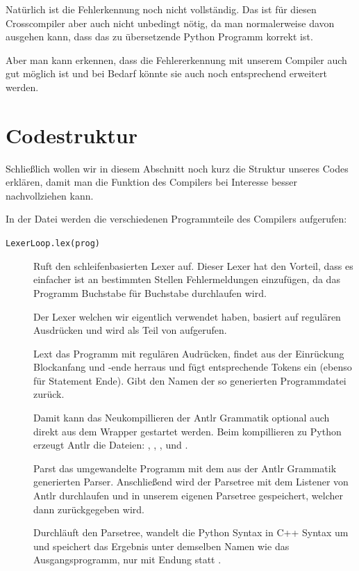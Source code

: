 Natürlich ist die Fehlerkennung noch nicht vollständig. Das ist für diesen Crosscompiler aber auch nicht unbedingt nötig, da man normalerweise davon ausgehen kann, dass das zu übersetzende Python Programm korrekt ist.

Aber man kann erkennen, dass die Fehlererkennung mit unserem Compiler auch gut möglich ist und bei Bedarf könnte sie auch noch entsprechend erweitert werden.






\clearpage

\section{Codestruktur}

Schließlich wollen wir in diesem Abschnitt noch kurz die Struktur unseres Codes erklären, damit man die Funktion des Compilers bei Interesse besser nachvollziehen kann.

In der  Datei  werden die verschiedenen Programmteile des Compilers aufgerufen:

\begin{description}

\item[\texttt{LexerLoop.lex(prog)}] Ruft den schleifenbasierten Lexer auf. Dieser Lexer hat den Vorteil, dass es einfacher ist an bestimmten Stellen Fehlermeldungen einzufügen, da das Programm Buchstabe für Buchstabe durchlaufen wird.

 Der Lexer welchen wir eigentlich verwendet haben, basiert auf regulären Ausdrücken und wird als Teil von  aufgerufen.
 
\item[] Lext das Programm mit regulären Audrücken, findet aus der Einrückung Blockanfang und -ende herraus und fügt entsprechende Tokens ein (ebenso für Statement Ende). Gibt den Namen der so generierten Programmdatei zurück.

\item[] Damit kann das Neukompillieren der Antlr Grammatik  optional  auch direkt aus dem  Wrapper gestartet werden. Beim kompillieren zu Python erzeugt Antlr die Dateien: , , ,  und  .

\item[] Parst das umgewandelte Programm  mit dem aus der Antlr Grammatik generierten Parser. Anschließend wird der Parsetree mit dem Listener von Antlr durchlaufen und in unserem eigenen Parsetree gespeichert, welcher dann zurückgegeben wird.


\item[] Durchläuft den Parsetree, wandelt die Python Syntax in C++ Syntax um und speichert das Ergebnis unter demselben Namen wie das Ausgangsprogramm, nur mit Endung  statt .

\end{description}

